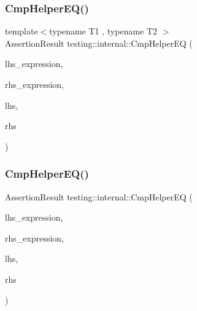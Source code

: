 \subsubsection{\texorpdfstring{CmpHelperEQ()}{CmpHelperEQ()}\hspace{0.1cm}{\footnotesize\ttfamily [1/2]}}
{\footnotesize\ttfamily template$<$typename T1 , typename T2 $>$ \\
Assertion\+Result testing\+::internal\+::\+Cmp\+Helper\+EQ (\begin{DoxyParamCaption}\item[{const char $\ast$}]{lhs\+\_\+expression,  }\item[{const char $\ast$}]{rhs\+\_\+expression,  }\item[{const T1 \&}]{lhs,  }\item[{const T2 \&}]{rhs }\end{DoxyParamCaption})}

\mbox{\label{namespacetesting_1_1internal_a46582d95cbfe3d3d8f6945c9e9cd779c}} 
\subsubsection{\texorpdfstring{CmpHelperEQ()}{CmpHelperEQ()}\hspace{0.1cm}{\footnotesize\ttfamily [2/2]}}
{\footnotesize\ttfamily Assertion\+Result testing\+::internal\+::\+Cmp\+Helper\+EQ (\begin{DoxyParamCaption}\item[{const char $\ast$}]{lhs\+\_\+expression,  }\item[{const char $\ast$}]{rhs\+\_\+expression,  }\item[{\mbox{\hyperlink{namespacetesting_1_1internal_a05c6bd9ede5ccdf25191a590d610dcc6}{Biggest\+Int}}}]{lhs,  }\item[{\mbox{\hyperlink{namespacetesting_1_1internal_a05c6bd9ede5ccdf25191a590d610dcc6}{Biggest\+Int}}}]{rhs }\end{DoxyParamCaption})}

\mbox{\label{namespacetesting_1_1internal_a1def8ec9393360a1b34a20528703e7f7}} 
